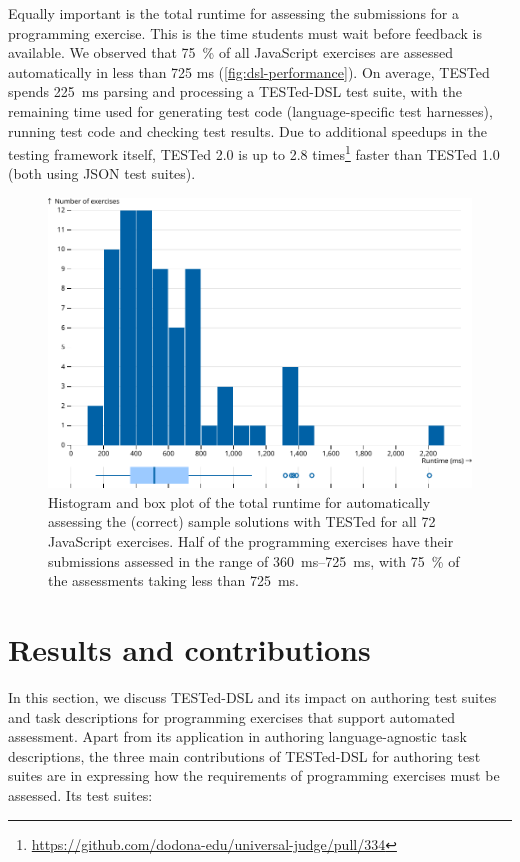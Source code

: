 \documentclass[../main]{subfiles}
\begin{document}
Equally important is the total runtime for assessing the submissions for a programming exercise.
This is the time students must wait before feedback is available.
We observed that \qty{75}{\percent} of all JavaScript exercises are assessed automatically in less than 725 ms (\vref{fig:dsl-performance}).
On average, TESTed spends \qty{225}{\milli\second} parsing and processing a TESTed-DSL test suite, with the remaining time used for generating test code (language-specific test harnesses), running test code and checking test results.
Due to additional speedups in the testing framework itself, TESTed 2.0 is up to 2.8 times\footnote{\url{https://github.com/dodona-edu/universal-judge/pull/334}} faster than TESTed 1.0 (both using JSON test suites).

\begin{figure}
    \centering
    \includegraphics[width=\textwidth]{performance}
    \caption{Histogram and box plot of the total runtime for automatically assessing the (correct) sample solutions with TESTed for all \num{72} JavaScript exercises.
    Half of the programming exercises have their submissions assessed in the range of \SIrange{360}{725}{\milli\second}, with \qty{75}{\percent} of the assessments taking less than \qty{725}{\milli\second}.\label{fig:dsl-performance}}
\end{figure}

\section{Results and contributions}\label{sec:dsl-results-and-contributions}

In this section, we discuss TESTed-DSL and its impact on authoring test suites and task descriptions for programming exercises that support automated assessment.
Apart from its application in authoring language-agnostic task descriptions, the three main contributions of TESTed-DSL for authoring test suites are in expressing how the requirements of programming exercises must be assessed.
Its test suites:
\end{document}
